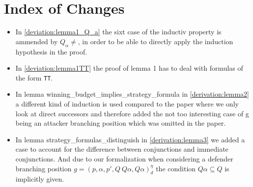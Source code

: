 \section{Index of Changes}
\begin{itemize}
    \item In \ref{deviation:lemma1_Q_a} the sixt case of the inductiv property is ammended by $Q_\alpha \neq {}$,
    in order to be able to directly apply the induction hypothesis in the proof.
    \item In \ref{deviation:lemma1TT} the proof of lemma 1 has to deal with formulas of the form \texttt{TT}. 
    \item  In lemma winning\_budget\_implies\_strategy\_formula in \ref{derivation:lemma2} a different kind of induction is used compared to the paper 
    where we only look at direct successors and therefore added the not too interesting case of g being an 
    attacker branching position which was omitted in the paper.
   \item In lemma strategy\_formulas\_distinguish in  \ref{derivation:lemma3} we added a case to account for the difference between 
    conjunctions and immediate conjunctions. And due to our formalization when considering a
    defender branching position $g=(p,\alpha ,p', Q \ Q\alpha, Q\alpha)_d^\eta$ the condition 
    $Q \alpha \subseteq Q$ is implicitly given.
\end{itemize}

